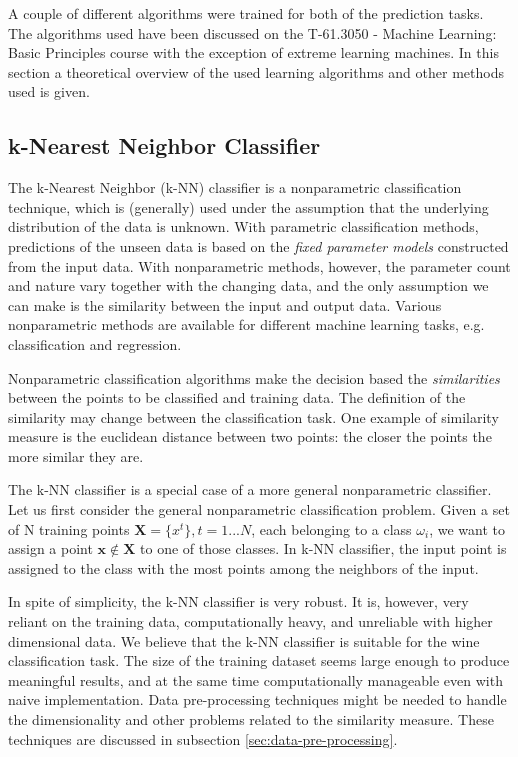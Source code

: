 A couple of different algorithms were trained for both of the prediction tasks. The algorithms used have been discussed on the T-61.3050 - Machine Learning: Basic Principles course with the exception of extreme learning machines. In this section a theoretical overview of the used learning algorithms and other methods used is given.

\subsection{k-Nearest Neighbor Classifier}
The k-Nearest Neighbor (k-NN) classifier is a nonparametric classification technique, which is (generally) used under the assumption that the underlying distribution of the data is unknown. With parametric classification methods, predictions of the unseen data is based on the \emph{fixed parameter models} constructed from the input data. With nonparametric methods, however, the parameter count and nature vary together with the changing data, and the only assumption we can make is the similarity between the input and output data. Various nonparametric methods are available for different machine learning tasks, e.g. classification and regression. \cite{alpaydin:2004:introduction} %

Nonparametric classification algorithms make the decision based the \emph{similarities} between the points to be classified and training data. The definition of the similarity may change between the classification task. One example of similarity measure is the euclidean distance between two points: the closer the points the more similar they are.

The k-NN classifier is a special case of a more general nonparametric classifier. Let us first consider the general nonparametric classification problem. Given a set of N training points  $\mathbf{X} = \{x^{t}\}, t=1...N$, each belonging to a class $\omega_{i}$, we want to assign a point $\mathbf{x} \notin \mathbf{X}$ to one of those classes. In k-NN classifier, the input point is assigned to the class with the most points among the neighbors of the input.

In spite of simplicity, the k-NN classifier is very robust. It is, however, very reliant on the
training data, computationally heavy, and unreliable with higher dimensional data. We believe that the k-NN classifier is suitable for the wine classification task. The size of the training dataset seems large enough to produce meaningful results, and at the same time computationally manageable even with naive implementation. Data pre-processing techniques might be needed to handle the dimensionality and other problems related to the similarity measure. These techniques are discussed in subsection \ref{sec:data-pre-processing}.

